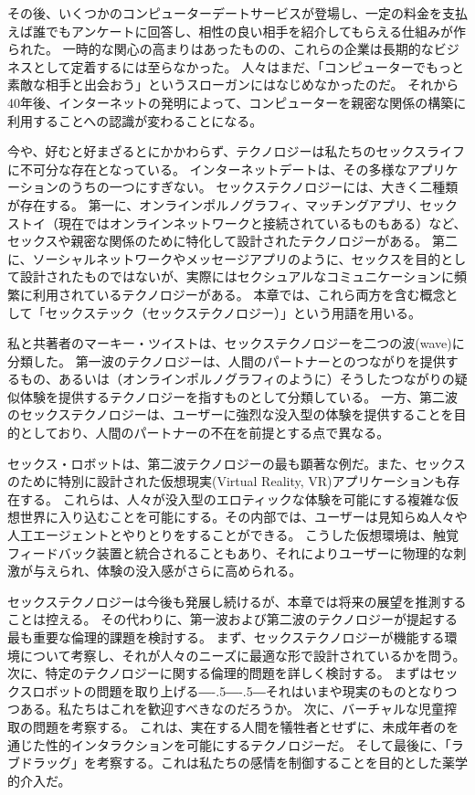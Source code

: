 \documentclass[paper=a4,book,openany]{jlreq}
\def\DDASH{―\kern-.5\zw―\kern-.5\zw―}
\begin{document}
その後、いくつかのコンピューターデートサービスが登場し、一定の料金を支払えば誰でもアンケートに回答し、相性の良い相手を紹介してもらえる仕組みが作られた。
一時的な関心の高まりはあったものの、これらの企業は長期的なビジネスとして定着するには至らなかった。
人々はまだ、「コンピューターでもっと素敵な相手と出会おう」というスローガンにはなじめなかったのだ。
それから40年後、インターネットの発明によって、コンピューターを親密な関係の構築に利用することへの認識が変わることになる。

今や、好むと好まざるとにかかわらず、テクノロジーは私たちのセックスライフに不可分な存在となっている。
インターネットデートは、その多様なアプリケーションのうちの一つにすぎない。
セックステクノロジーには、大きく二種類が存在する。
第一に、オンラインポルノグラフィ、マッチングアプリ、セックストイ（現在ではオンラインネットワークと接続されているものもある）など、セックスや親密な関係のために特化して設計されたテクノロジーがある。
第二に、ソーシャルネットワークやメッセージアプリのように、セックスを目的として設計されたものではないが、実際にはセクシュアルなコミュニケーションに頻繁に利用されているテクノロジーがある。
本章では、これら両方を含む概念として「セックステック（セックステクノロジー）」という用語を用いる。

私と共著者のマーキー・ツイストは、セックステクノロジーを二つの波(wave)に分類した\citep{mcarthur17:_rise_digis}。
第一波のテクノロジーは、人間のパートナーとのつながりを提供するもの、あるいは（オンラインポルノグラフィのように）そうしたつながりの疑似体験を提供するテクノロジーを指すものとして分類している。
一方、第二波のセックステクノロジーは、ユーザーに強烈な没入型の体験を提供することを目的としており、人間のパートナーの不在を前提とする点で異なる。

セックス・ロボットは、第二波テクノロジーの最も顕著な例だ。また、セックスのために特別に設計された仮想現実(Virtual Reality, VR)アプリケーションも存在する。
これらは、人々が没入型のエロティックな体験を可能にする複雑な仮想世界に入り込むことを可能にする。その内部では、ユーザーは見知らぬ人々や人工エージェントとやりとりをすることができる。
こうした仮想環境は、触覚フィードバック装置と統合されることもあり、それによりユーザーに物理的な刺激が与えられ、体験の没入感がさらに高められる。

セックステクノロジーは今後も発展し続けるが、本章では将来の展望を推測することは控える。
その代わりに、第一波および第二波のテクノロジーが提起する最も重要な倫理的課題を検討する。
まず、セックステクノロジーが機能する環境について考察し、それが人々のニーズに最適な形で設計されているかを問う。
次に、特定のテクノロジーに関する倫理的問題を詳しく検討する。
まずはセックスロボットの問題を取り上げる{\DDASH}それはいまや現実のものとなりつつある。私たちはこれを歓迎すべきなのだろうか。
次に、バーチャルな児童搾取の問題を考察する。
これは、実在する人間を犠牲者とせずに、未成年者のを通じた性的インタラクションを可能にするテクノロジーだ。
そして最後に、「ラブドラッグ」を考察する。これは私たちの感情を制御することを目的とした薬学的介入だ。
\end{document}
